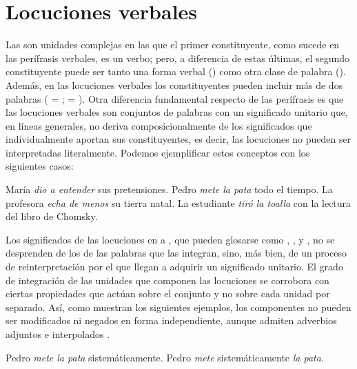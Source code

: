 \section{Locuciones verbales}\label{sec:11-locuciones}

Las  son unidades complejas en las que el primer
constituyente, como sucede en las perífrasis verbales, es un verbo; pero, a
diferencia de estas últimas, el segundo constituyente puede ser tanto una forma
verbal () como otra clase de palabra (). Además, en las locuciones verbales los
constituyentes pueden incluir más de dos palabras ( =
;  = ). Otra diferencia
fundamental respecto de las perífrasis es que las locuciones verbales son
conjuntos de palabras con un significado unitario que, en líneas generales, no
deriva composicionalmente de los significados que individualmente aportan sus
constituyentes, es decir, las locuciones no pueden ser interpretadas
literalmente. Podemos ejemplificar estos conceptos con los siguientes casos:

\begin{exe}
  \ex\label{ex:11-entender} María \textit{dio a entender} sus pretensiones.
  \ex Pedro \textit{mete la pata} todo el tiempo.
  \ex La profesora \textit{echa de menos} su tierra natal.
  \ex\label{ex:11-toalla1} La estudiante \textit{tiró la toalla} con la lectura
      del libro de Chomsky.
\end{exe}

Los significados de las locuciones en  a
, que pueden glosarse como , ,
 y , no se desprenden de los de las palabras que las
integran, sino, más bien, de un proceso de reinterpretación por el que llegan a
adquirir un significado unitario. El grado de integración de las unidades que
componen las locuciones se corrobora con ciertas propiedades que actúan sobre el
conjunto y no sobre cada unidad por separado. Así, como muestran los siguientes
ejemplos, los componentes no pueden ser modificados  ni
negados  en forma independiente, aunque admiten adverbios
adjuntos  e interpolados .

\begin{exe}
  \ex
    \begin{xlist}
    \end{xlist}
  \ex
    \begin{xlist}
      \ex\label{ex:11-pata-a} Pedro \textit{mete la pata} sistemáticamente.
      \ex\label{ex:11-pata-b} Pedro \textit{mete} sistemáticamente \textit{la
          pata}.
    \end{xlist}
\end{exe}

